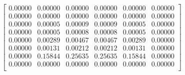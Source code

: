 \documentclass[a4paper, 11pt]{report}
\begin{document}
\begin{enumerate}[leftmargin=*]
\begin{minipage}{0.6\columnwidth}
\begin{align*}
{\begin{bmatrix}
                    0.00000  & 0.00000  & 0.00000 &  0.00000  & 0.00000  & 0.00000  \\
                    0.00000  & 0.00000  & 0.00000 &  0.00000  & 0.00000  & 0.00000  \\
                    0.00000  & 0.00005  & 0.00009 &  0.00009  & 0.00005  & 0.00000  \\
                    0.00000  & 0.00005  & 0.00008 &  0.00008  & 0.00005  & 0.00000  \\
                    0.00000  & 0.00289  & 0.00467 &  0.00467  & 0.00289  & 0.00000  \\
                    0.00000  & 0.00131  & 0.00212 &  0.00212  & 0.00131  & 0.00000  \\
                    0.00000  & 0.15844  & 0.25635 &  0.25635  & 0.15844  & 0.00000  \\
                    0.00000  & 0.00000  & 0.00000 &  0.00000  & 0.00000  & 0.00000  \\
                \end{bmatrix}}
            \end{align*}
        \end{minipage}
        
\end{enumerate}
\end{document}
